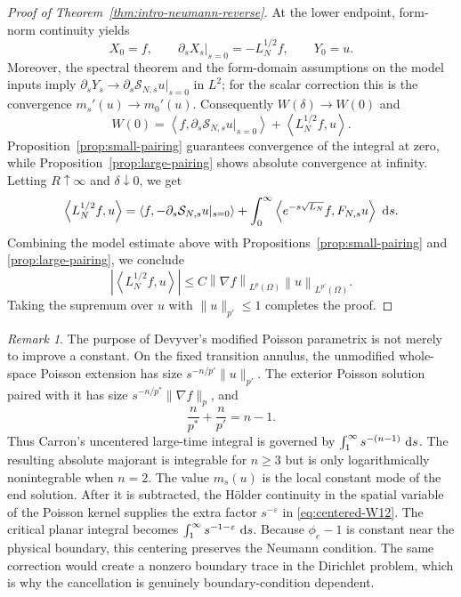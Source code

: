 \documentclass[12pt]{amsart}
\newcommand\dd{\,{\rm d}}
\newcommand{\ip}[2]{\left\langle #1,#2\right\rangle}
\newcommand{\norm}[2]{\left\lVert #1\right\rVert_{#2}}
\newcommand{\abs}[1]{\left\lvert #1\right\rvert}
\theoremstyle{remark}
\newtheorem{remark}[theorem]{Remark}
\begin{document}
\begin{proof}[Proof of Theorem~\ref{thm:intro-neumann-reverse}]
At the lower endpoint, form-norm continuity yields
\[
 X_0=f,
 \qquad \partial_sX_s|_{s=0}=-L_N^{1/2}f,
 \qquad Y_0=u.
\]
Moreover, the spectral theorem and the form-domain assumptions on the
model inputs imply
$\partial_sY_s\to\partial_s\mathcal S_{N,s}u|_{s=0}$ in $L^2$; for the
scalar correction this is the convergence $m_s'(u)\to m_0'(u)$.
Consequently $W(\delta)\to W(0)$ and
\[
 W(0)=\ip f{\partial_s\mathcal S_{N,s}u|_{s=0}}
       +\ip{L_N^{1/2}f}{u}.
\]
Proposition~\ref{prop:small-pairing} guarantees convergence of the integral at
zero, while Proposition~\ref{prop:large-pairing} shows absolute
convergence at infinity.  Letting $R\uparrow\infty$ and
$\delta\downarrow0$, we get
\[
 \ip{L_N^{1/2}f}{u}
 =\ip f{-\partial_s\mathcal S_{N,s}u|_{s=0}}
 +\int_0^\infty
  \ip{e^{-s\sqrt{L_N}}f}{F_{N,s}u}\,\dd s.
\]
Combining the model estimate above with
Propositions~\ref{prop:small-pairing} and \ref{prop:large-pairing}, we conclude
\[
 \abs{\ip{L_N^{1/2}f}{u}}
 \leq C\norm{\nabla f}{L^p(\Omega)}\norm u{L^{p'}(\Omega)}.
\]
Taking the supremum over $u$ with $\|u\|_{p'}\leq1$ completes the proof.
\end{proof}

\begin{remark}
The purpose of Devyver's modified Poisson parametrix is not merely to improve
a constant.  On the
fixed transition annulus, the unmodified whole-space Poisson extension has
size $s^{-n/p'}\|u\|_{p'}$.  The exterior Poisson solution paired with it
has size $s^{-n/p^*}\|\nabla f\|_p$, and
\[
 \frac n{p^*}+\frac n{p'}=n-1.
\]
Thus Carron's uncentered large-time integral is governed by $\int_1^\infty s^{-(n-1)}\,\dd s$. The resulting absolute majorant is integrable for $n\geq3$ but is only
logarithmically nonintegrable when $n=2$.
The value $m_s(u)$ is the local constant mode of the end solution.  After it
is subtracted, the H\"older continuity in the spatial variable of the
Poisson kernel supplies the extra factor $s^{-\varepsilon}$ in
\eqref{eq:centered-W12}.  The critical planar integral becomes
$\int_1^\infty s^{-1-\varepsilon}\,\dd s$.  Because
$\phi_e-1$ is constant near the physical boundary, this centering preserves
the Neumann condition.  The same correction would create a nonzero boundary
trace in the Dirichlet problem, which is why the cancellation is genuinely
boundary-condition dependent.
\end{remark}
\end{document}
